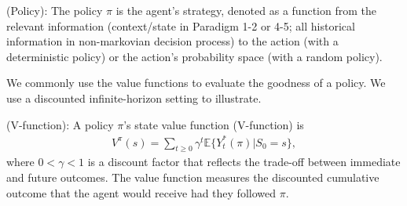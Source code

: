 

\begin{definition}\label{def:policy} (Policy): 
The policy $\pi$ is the agent's strategy, denoted as a function from the relevant information (context/state in Paradigm 1-2 or 4-5; all historical information in non-markovian decision process)  to the action (with a deterministic policy) or the action's probability space (with a random policy). 
\end{definition}

We commonly use the value functions to evaluate 
the goodness of a policy. 
We use a discounted infinite-horizon setting to illustrate. 

\begin{definition} (V-function): 
A policy $\pi$'s state value function (V-function) is  
\begin{eqnarray*}
	V^{\pi}(s)=\sum_{t\ge 0} \gamma^t \mathbb{E} \{Y_t^*(\pi)|S_0=s\},
\end{eqnarray*}
where $0<\gamma<1$ is a discount factor that reflects the trade-off between immediate and future outcomes. The value function measures the discounted cumulative outcome that the agent would receive had they followed $\pi$. 
\end{definition}

